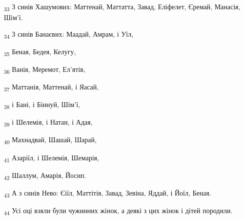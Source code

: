 \begin{tcolorbox}
\textsubscript{33} З синів Хашумових: Маттенай, Маттатта, Завад, Еліфелет, Єремай, Манасія, Шім'ї.
\end{tcolorbox}
\begin{tcolorbox}
\textsubscript{34} З синів Банаєвих: Маадай, Амрам, і Уїл,
\end{tcolorbox}
\begin{tcolorbox}
\textsubscript{35} Беная, Бедея, Келугу,
\end{tcolorbox}
\begin{tcolorbox}
\textsubscript{36} Ванія, Меремот, Ел'ятів,
\end{tcolorbox}
\begin{tcolorbox}
\textsubscript{37} Маттанія, Маттенай, і Яасай,
\end{tcolorbox}
\begin{tcolorbox}
\textsubscript{38} і Бані, і Біннуй, Шім'ї,
\end{tcolorbox}
\begin{tcolorbox}
\textsubscript{39} і Шелемія, і Натан, і Адая,
\end{tcolorbox}
\begin{tcolorbox}
\textsubscript{40} Махнадвай, Шашай, Шарай,
\end{tcolorbox}
\begin{tcolorbox}
\textsubscript{41} Азаріїл, і Шелемія, Шемарія,
\end{tcolorbox}
\begin{tcolorbox}
\textsubscript{42} Шаллум, Амарія, Йосип.
\end{tcolorbox}
\begin{tcolorbox}
\textsubscript{43} А з синів Нево: Єіїл, Маттітія, Завад, Зевіна, Яддай, і Йоїл, Беная.
\end{tcolorbox}
\begin{tcolorbox}
\textsubscript{44} Усі оці взяли були чужинних жінок, а деякі з цих жінок і дітей породили.
\end{tcolorbox}
